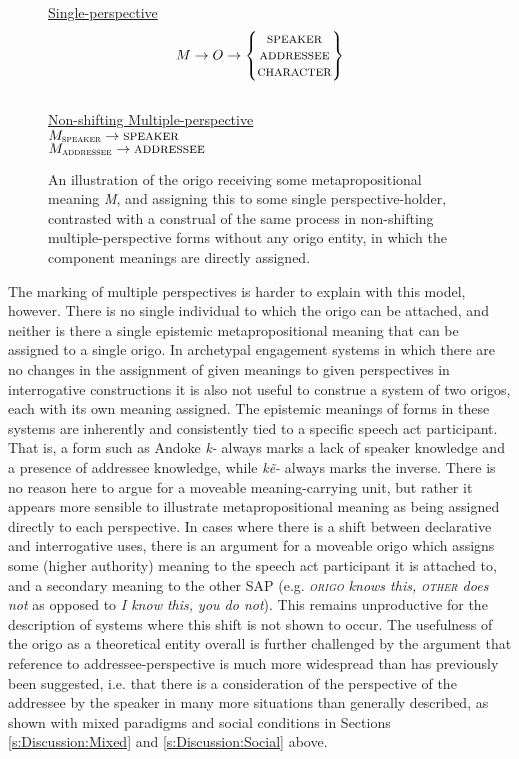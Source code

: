     \begin{figure}
        \centering
\underline{Single-perspective}
\[M \rightarrow O \rightarrow \begin{Bmatrix}
    \textsc{speaker} \\ 
    \textsc{addressee} \\ 
    \textsc{character}
\end{Bmatrix}\] \\

\underline{Non-shifting Multiple-perspective} \\
\(M_{\textsc{speaker}} \rightarrow{\textsc{speaker}}\) \\
\(M_{\textsc{addressee}} \rightarrow{\textsc{addressee}}\)
\caption{An illustration of the origo receiving some metapropositional meaning \textit{M}, and assigning this to some single perspective-holder, contrasted with a construal of the same process in non-shifting multiple-perspective forms without any origo entity, in which the component meanings are directly assigned.}\label{f:Discussion:Origo}
    \end{figure}

The marking of multiple perspectives is harder to explain with this model, however. There is no single individual to which the origo can be attached, and neither is there a single epistemic metapropositional meaning that can be assigned to a single origo. In archetypal engagement systems in which there are no changes in the assignment of given meanings to given perspectives in interrogative constructions it is also not useful to construe a system of two origos, each with its own meaning assigned. The epistemic meanings of forms in these systems are inherently and consistently tied to a specific speech act participant. That is, a form such as Andoke \cite[Isolate: Colombia,][117]{EvansBergqvistSanRoque2018a} \textit{k-} always marks a lack of speaker knowledge and a presence of addressee knowledge, while \textit{kẽ-} always marks the inverse. There is no reason here to argue for a moveable meaning-carrying unit, but rather it appears more sensible to illustrate metapropositional meaning as being assigned directly to each perspective. In cases where there is a shift between declarative and interrogative uses, there is an argument for a moveable origo which assigns some (higher authority) meaning to the speech act participant it is attached to, and a secondary meaning to the other SAP (e.g. \textit{\textsc{origo} knows this, \textsc{other} does not} as opposed to \textit{I know this, you do not}). This remains unproductive for the description of systems where this shift is not shown to occur. The usefulness of the origo as a theoretical entity overall is further challenged by the argument that reference to addressee-perspective is much more widespread than has previously been suggested, i.e. that there is a consideration of the perspective of the addressee by the speaker in many more situations than generally described, as shown with mixed paradigms and social conditions in Sections \ref{s:Discussion:Mixed} and \ref{s:Discussion:Social} above.

